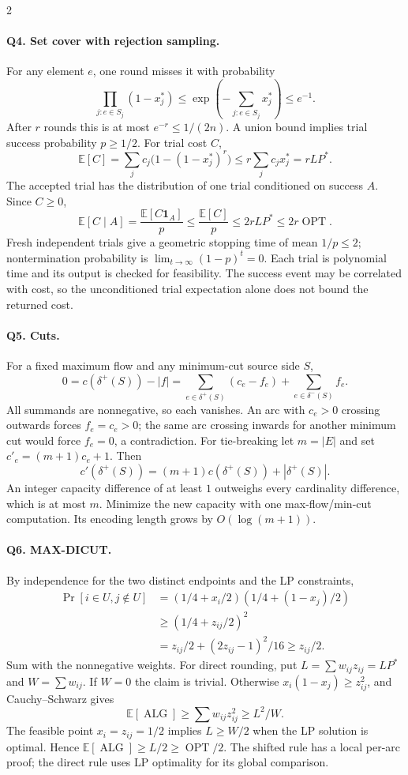 \documentclass[8pt]{extarticle}
\theoremstyle{definition}
\newcommand{\OPT}{\operatorname{OPT}}
\newcommand{\ALG}{\operatorname{ALG}}
\begin{document}
\begin{multicols*}{2}
\paragraph{Q4. Set cover with rejection sampling.}
For any element $e$, one round misses it with probability
\[
\prod_{j:e\in S_j}(1-x_j^*)
\le \exp\!\left(-\sum_{j:e\in S_j}x_j^*\right)\le e^{-1}.
\]
After $r$ rounds this is at most $e^{-r}\le1/(2n)$.  A union bound implies
trial success probability $p\ge1/2$.  For trial cost $C$,
\[
\mathbb E[C]=\sum_j c_j\bigl(1-(1-x_j^*)^r\bigr)
\le r\sum_j c_jx_j^*=rLP^*.
\]
The accepted trial has the distribution of one trial conditioned on success
$A$.  Since $C\ge0$,
\[
\mathbb E[C\mid A]
=\frac{\mathbb E[C\mathbf1_A]}p
\le\frac{\mathbb E[C]}p\le2rLP^*\le2r\OPT.
\]
Fresh independent trials give a geometric stopping time of mean $1/p\le2$;
nontermination probability is $\lim_{t\to\infty}(1-p)^t=0$.
Each trial is polynomial time and its output is checked for feasibility.
The success event may be correlated with cost, so the unconditioned trial
expectation alone does not bound the returned cost.

\paragraph{Q5. Cuts.}
For a fixed maximum flow and any minimum-cut source side $S$,
\[
0=c(\delta^+(S))-|f|
=\sum_{e\in\delta^+(S)}(c_e-f_e)
 +\sum_{e\in\delta^-(S)}f_e.
\]
All summands are nonnegative, so each vanishes.  An arc with $c_e>0$
crossing outwards forces $f_e=c_e>0$; the same arc crossing inwards for
another minimum cut would force $f_e=0$, a contradiction.
For tie-breaking let $m=|E|$ and set $c'_e=(m+1)c_e+1$.  Then
\[
c'(\delta^+(S))=(m+1)c(\delta^+(S))+|\delta^+(S)|.
\]
An integer capacity difference of at least $1$ outweighs every cardinality
difference, which is at most $m$.  Minimize the new capacity with one
max-flow/min-cut computation.  Its encoding length grows by $O(\log(m+1))$.

\paragraph{Q6. MAX-DICUT.}
By independence for the two distinct endpoints and the LP constraints,
\begin{align*}
\Pr[i\in U,j\notin U]
&=(1/4+x_i/2)(1/4+(1-x_j)/2)\\
&\ge(1/4+z_{ij}/2)^2\\
&=z_{ij}/2+(2z_{ij}-1)^2/16\ge z_{ij}/2.
\end{align*}
Sum with the nonnegative weights.  For direct rounding, put
$L=\sum w_{ij}z_{ij}=LP^*$ and $W=\sum w_{ij}$.  If $W=0$ the claim is
trivial.  Otherwise $x_i(1-x_j)\ge z_{ij}^2$, and Cauchy--Schwarz gives
\[
\mathbb E[\ALG]\ge\sum w_{ij}z_{ij}^2\ge L^2/W.
\]
The feasible point $x_i=z_{ij}=1/2$ implies $L\ge W/2$ when the LP
solution is optimal.  Hence $\mathbb E[\ALG]\ge L/2\ge\OPT/2$.
The shifted rule has a local per-arc proof; the direct rule uses LP
optimality for its global comparison.


\end{multicols*}
\end{document}
